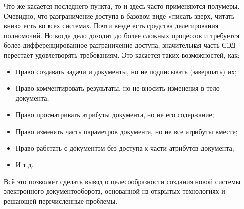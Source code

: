 \vspace{\baselineskip}
Что же касается последнего пункта, то и здесь часто применяются полумеры. Очевидно, что разграничение доступа в базовом виде «писать вверх, читать вниз» есть во всех системах. Почти везде есть средства делегирования полномочий. Но когда дело доходит до более сложных процессов и требуется более дифференцированное разграничение доступа, значительная часть СЭД перестаёт удовлетворять требованиям. Это касается таких возможностей, как:
\begin{itemize}
	\item Право создавать задачи и документы, но не подписывать (завершать) их;
	\item Право комментировать результаты, но не вносить изменения в тело документа;
	\item Право просматривать атрибуты документа, но не его содержание;
	\item Право изменять часть параметров документа, но не все атрибуты вместе;
	\item Право работать с документом без доступа к части атрибутов документа;
	\item И т.д.
\end{itemize}

Всё это позволяет сделать вывод о целесообразности создания новой системы электронного документооборота, основанной на открытых технологиях и решающей перечисленные проблемы.

